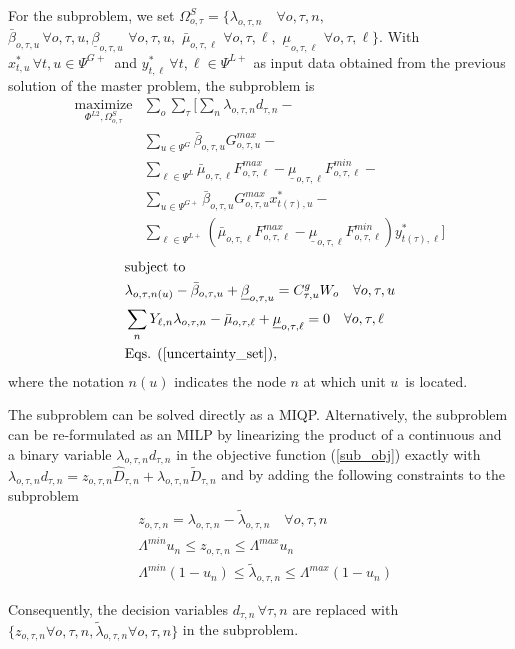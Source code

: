 For the subproblem, we set $\Omega^{S}_{o, \tau} = \{ \lambda_{o, \tau, n} \quad \forall o, \tau, n, $ $\bar{\beta}_{o, \tau, u} \, \forall o, \tau, u, \underline{\beta}_{o, \tau, u} \,\, \forall o, \tau, u, \,\, \bar{\mu}_{o, \tau, \ell} \,\, \forall o, \tau, \ell, \,\, \underline{\mu}_{o, \tau, \ell} \,\, \forall o, \tau, \ell \}$. With $x_{t, u}^* \, \forall t, u \in \Psi^{G+}$ and $y_{t, \ell}^* \, \forall t, \ell \in \Psi^{L+}$ as input data obtained from the previous solution of the master problem, the subproblem is
\begin{align}
\label{sub_obj} \underset{\Phi^{L2}, \Omega_{o, \tau}^{S}}{\text{maximize}} &\sum\limits_o \sum\limits_{\tau} \Bigg[ \sum\limits_n \lambda_{o, \tau, n} d_{\tau, n} - \nonumber \\
&\sum\limits_{u \in \Psi^G} \bar{\beta}_{o, \tau, u} G_{o, \tau, u}^{max} - \nonumber \\
&\sum\limits_{\ell \in \Psi^L} \bar{\mu}_{o, \tau, \ell} F_{o, \tau, \ell}^{max} - \underline{\mu}_{o, \tau, \ell} F_{o, \tau, \ell}^{min} - \nonumber \\
&\sum\limits_{u \in \Psi^{G+}} \bar{\beta}_{o, \tau, u} G_{o, \tau, u}^{max} x_{t(\tau), u}^* - \nonumber \\
&\sum\limits_{\ell \in \Psi^{L+}} \left( \bar{\mu}_{o, \tau, \ell} F_{o, \tau, \ell}^{max} - \underline{\mu}_{o, \tau, \ell} F_{o, \tau, \ell}^{min} \right) y_{t(\tau), \ell}^* \Bigg]
\end{align}
\begin{align}
&\text{subject to} \nonumber \\
&\lambda_{o, \tau, n(u)} - \bar{\beta}_{o, \tau, u} + \underline{\beta}_{o, \tau, u} = C^g_{\tau, u}  W_o \quad \forall o, \tau, u \\
&\sum\limits_n Y_{\ell, n} \lambda_{o, \tau, n} - \bar{\mu}_{o, \tau, \ell} + \underline{\mu}_{o, \tau, \ell} = 0 \quad \forall o, \tau, \ell \\
&\text{Eqs. } (\ref{uncertainty_set}),
\end{align}
where the notation $n(u)$ indicates the node $n$ at which unit $u$ is located.

The subproblem can be solved directly as a MIQP. Alternatively, the subproblem can be re-formulated as an MILP by linearizing the product of a continuous and a binary variable $\lambda_{o, \tau, n} d_{\tau, n}$ in the objective function (\ref{sub_obj}) exactly with $\lambda_{o, \tau, n} d_{\tau, n} = z_{o, \tau, n} \hat{D}_{\tau, n} + \lambda_{o, \tau, n} \tilde{D}_{\tau, n}$ and by adding the following constraints to the subproblem
\begin{align}
&z_{o, \tau, n} = \lambda_{o, \tau, n} - \tilde{\lambda}_{o, \tau, n} \quad \forall o, \tau, n \\
&\Lambda^{min} u_n \leq z_{o, \tau, n} \leq \Lambda^{max} u_n \\
&\Lambda^{min} (1 - u_n) \leq \tilde{\lambda}_{o, \tau, n} \leq \Lambda^{max} (1 - u_n)
\end{align}

Consequently, the decision variables $d_{\tau, n} \, \forall \tau, n$ are replaced with $\{ z_{o, \tau, n} \forall o, \tau, n, \tilde{\lambda}_{o, \tau, n} \forall o, \tau, n \}$ in the subproblem.
